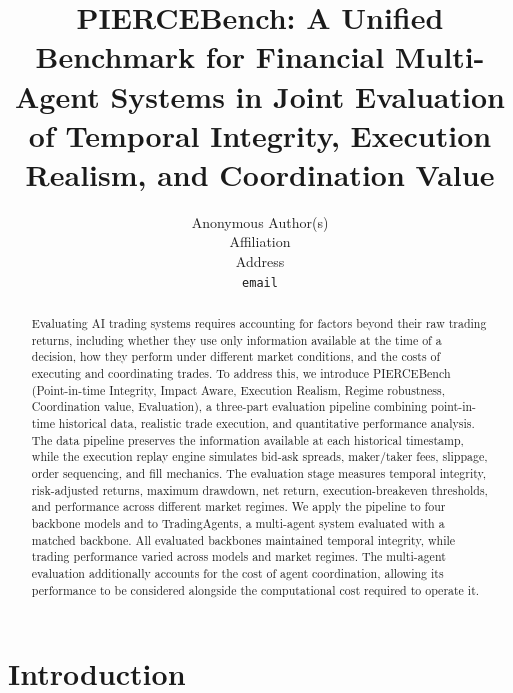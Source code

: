 \documentclass{article}
\title{PIERCEBench: A Unified Benchmark for Financial Multi-Agent Systems in Joint Evaluation of Temporal Integrity, Execution Realism, and Coordination Value}
\author{%
  Anonymous Author(s) \\
  Affiliation \\
  Address \\
  \texttt{email} \\
}
\begin{document}
\maketitle

\begin{abstract}
Evaluating AI trading systems requires accounting for factors beyond their raw trading returns, including whether they use only information available at the time of a decision, how they perform under different market conditions, and the costs of executing and coordinating trades. To address this, we introduce PIERCEBench (Point-in-time Integrity, Impact Aware, Execution Realism, Regime robustness, Coordination value, Evaluation), a three-part evaluation pipeline combining point-in-time historical data, realistic trade execution, and quantitative performance analysis. The data pipeline preserves the information available at each historical timestamp, while the execution replay engine simulates bid-ask spreads, maker/taker fees, slippage, order sequencing, and fill mechanics. The evaluation stage measures temporal integrity, risk-adjusted returns, maximum drawdown, net return, execution-breakeven thresholds, and performance across different market regimes. We apply the pipeline to four backbone models and to TradingAgents, a multi-agent system evaluated with a matched backbone. All evaluated backbones maintained temporal integrity, while trading performance varied across models and market regimes. The multi-agent evaluation additionally accounts for the cost of agent coordination, allowing its performance to be considered alongside the computational cost required to operate it.
\end{abstract}

\section{Introduction}
\end{document}
